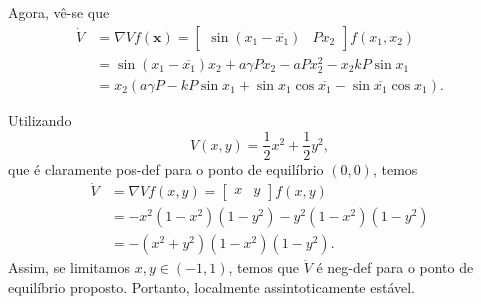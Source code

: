 \documentclass[a4paper]{report}
\begin{document}
Agora, vê-se que 
\begin{align*}
    \dot{V} &= \nabla V f(\bm{x}) = \begin{bmatrix} \sin\left( x_1-\overline{x_1} \right) & Px_2 \end{bmatrix} f(x_1,x_2) \\
    &= \sin\left( x_1 - \overline{x_1} \right) x_2 + a\gamma P x_2 - aPx_2^2 -x_2kP\sin x_1 \\
    &= x_2 \left( a\gamma P - kP \sin x_1 +\sin x_1 \cos \overline{x_1} - \sin \overline{x_1}\cos x_1 \right) 
.\end{align*}


Utilizando \[
    V(x,y) = \frac{1}{2}x^2 + \frac{1}{2}y^2
,\] que é claramente pos-def para o ponto de equilíbrio $(0,0)$, temos
\begin{align*}
    \dot{V} &= \nabla V f(x,y) = \begin{bmatrix} x & y \end{bmatrix} f(x,y) \\
    &= -x^2\left( 1-x^2 \right) \left( 1-y^2 \right) -y^2\left( 1-x^2 \right) \left( 1-y^2 \right) \\
    &= -\left( x^2 + y^2 \right) \left( 1-x^2 \right) \left( 1-y^2 \right)
.\end{align*}
Assim, se limitamos $x,y \in \left( -1,1 \right) $, temos que $\dot{V}$ é neg-def para o ponto de equilíbrio proposto. Portanto, localmente assintoticamente estável.


\end{document}
